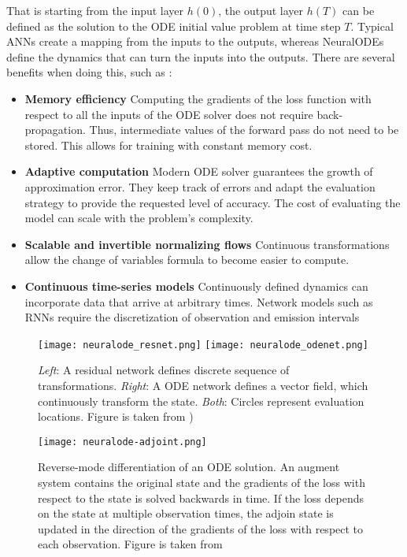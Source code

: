 That is starting from the input layer $h(0)$, the output layer $h(T)$ can be defined as the solution to the \gls{ODE} initial value problem at time step $T$.
Typical \glspl{ANN} create a mapping from the inputs to the outputs, whereas \glspl{NeuralODE} define the dynamics that can turn the inputs into the outputs.
There are several benefits when doing this, such as \cite{chenNeuralOrdinaryDifferential2019}:
\begin{itemize}
    \item \textbf{Memory efficiency}
    Computing the gradients of the loss function with respect to all the inputs of the \gls{ODE} solver does not require back-propagation.
    Thus, intermediate values of the forward pass do not need to be stored.
    This allows for training with constant memory cost.
    \item \textbf{Adaptive computation}
    Modern \gls{ODE} solver guarantees the growth of approximation error.
    They keep track of errors and adapt the evaluation strategy to provide the requested level of accuracy.
    The cost of evaluating the model can scale with the problem's complexity.
    \item \textbf{Scalable and invertible normalizing flows}
    Continuous transformations allow the change of variables formula to become easier to compute.
    \item \textbf{Continuous time-series models}
    Continuously defined dynamics can incorporate data that arrive at arbitrary times.
    Network models such as \glspl{RNN} require the discretization of observation and emission intervals
\end{itemize}

\begin{figure}[h]
    \centering
    \texttt{[image: neuralode\_resnet.png]}
    \texttt{[image: neuralode\_odenet.png]}
    \caption{\textit{Left}: A residual network defines discrete sequence of transformations. \textit{Right}: A ODE network defines a vector field, which continuously transform the state. \textit{Both}: Circles represent evaluation locations. Figure is taken from \citeauthor{chenNeuralOrdinaryDifferential2019} \cite{chenNeuralOrdinaryDifferential2019})}
    \label{fig:resnet-vs-odenet}
\end{figure}

\begin{figure}[h]
    \centering
    \texttt{[image: neuralode-adjoint.png]}
    \caption{Reverse-mode differentiation of an ODE solution. An augment system contains the original state and the gradients of the loss with respect to the state is solved backwards in time. If the loss depends on the state at multiple observation times, the adjoin state is updated in the direction of the gradients of the loss with respect to each observation. Figure is taken from \citeauthor{chenNeuralOrdinaryDifferential2019} \cite{chenNeuralOrdinaryDifferential2019}}
    \label{fig:neuralode-adjoint}
\end{figure}

